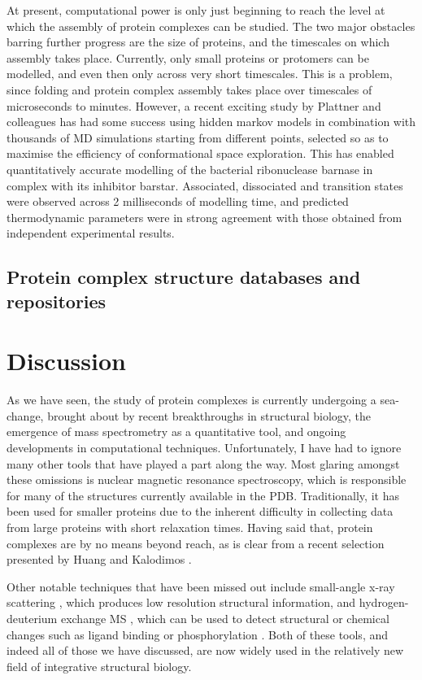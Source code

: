 \documentclass[a4paper,11pt,twoside,openright]{scrbook}
\begin{document}
At present, computational power is only just beginning to reach the level at which the assembly of protein complexes can be studied. The two major obstacles barring further progress are the size of proteins, and the timescales on which assembly takes place. Currently, only small proteins or protomers can be modelled, and even then only across very short timescales. This is a problem, since folding and protein complex assembly takes place over timescales of microseconds to minutes. However, a recent exciting study by Plattner and colleagues \cite{Plattner2017} has had some success using hidden markov models in combination with thousands of MD simulations starting from different points, selected so as to maximise the efficiency of conformational space exploration. This has enabled quantitatively accurate modelling of the bacterial ribonuclease barnase in complex with its inhibitor barstar. Associated, dissociated and transition states were observed across 2 milliseconds of modelling time, and predicted thermodynamic parameters were in strong agreement with those obtained from independent experimental results.

\subsection{Protein complex structure databases and repositories}

\section{Discussion}
As we have seen, the study of protein complexes is currently undergoing a sea-change, brought about by recent breakthroughs in structural biology, the emergence of mass spectrometry as a quantitative tool, and ongoing developments in computational techniques. Unfortunately, I have had to ignore many other tools that have played a part along the way. Most glaring amongst these omissions is nuclear magnetic resonance spectroscopy, which is responsible for many of the structures currently available in the PDB. Traditionally, it has been used for smaller proteins due to the inherent difficulty in collecting data from large proteins with short relaxation times. Having said that, protein complexes are by no means beyond reach, as is clear from a recent selection presented by Huang and Kalodimos \cite{Huang2017}.

Other notable techniques that have been missed out include small-angle x-ray scattering \cite{Mertens2010}, which produces low resolution structural information, and hydrogen-deuterium exchange MS \cite{Zhang2015b}, which can be used to detect structural or chemical changes such as ligand binding or phosphorylation \cite{Wang2009}. Both of these tools, and indeed all of those we have discussed, are now widely used in the relatively new field of integrative structural biology.
\end{document}
